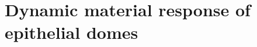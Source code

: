 \documentclass[11pt, final, a4paper, twoside, openright]{book}
\begin{document}
%	
%
%	
%	
%	
%
%	
%	
%	
%	
%	
%
	\renewcommand{\thesection}{7.\arabic{section}}
	\hypertarget{dynamic-material-response-of-epithelial-domes}{%
	\chapter{Dynamic material response of epithelial
	domes}\label{dynamic-material-response-of-epithelial-domes}}
\end{document}
